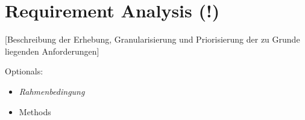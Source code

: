 \chapter{Requirement Analysis (!)}
[Beschreibung der Erhebung, Granularisierung und Priorisierung der zu Grunde liegenden Anforderungen]






Optionals:
\begin{itemize}
 \item \textit{Rahmenbedingung}
 \item Methods
\end{itemize}